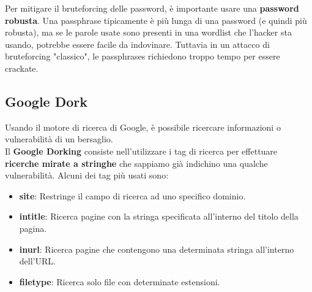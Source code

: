 \documentclass{article}
\begin{document}
Per mitigare il bruteforcing delle password, è importante usare una \textbf{password robusta}. Una passphrase tipicamente è più lunga di una password (e quindi più robusta), ma se le parole usate sono presenti in una wordlist che l'hacker sta usando, potrebbe essere facile da indovinare.
Tuttavia in un attacco di bruteforcing "classico", le passphrases richiedono troppo tempo per essere crackate.

\subsection{Google Dork}
Usando il motore di ricerca di Google, è possibile ricercare informazioni o vulnerabilità di un bersaglio.\\
Il \textbf{Google Dorking} consiste nell’utilizzare i tag di ricerca per effettuare \textbf{ricerche mirate a stringhe} che sappiamo già indichino una qualche vulnerabilità. Alcuni dei tag più usati sono:
\begin{itemize}
    \item \textbf{site}: Restringe il campo di ricerca ad uno specifico dominio.
    \item \textbf{intitle}: Ricerca pagine con la stringa specificata all’interno del titolo della pagina.
    \item \textbf{inurl}: Ricerca pagine che contengono una determinata stringa all’interno dell’URL.
    \item \textbf{filetype}: Ricerca solo file con determinate estensioni.
\end{itemize}
\end{document}
